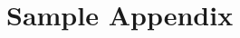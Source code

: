 \documentclass[11pt]{report}         %
\begin{document}
\chapter{Sample Appendix}
\label{chap:appendix}

 

                    



\begin{thesisauthorvita}                      
\end{thesisauthorvita}               
\end{document}
